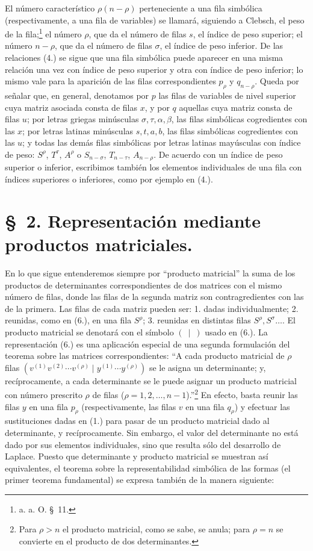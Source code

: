 \documentclass[11pt]{article}
\begin{document}
El número característico $\rho(n-\rho)$ perteneciente a una fila simbólica (respectivamente, a una fila de variables) se llamará, siguiendo a Clebsch, el peso de la fila;\footnote{a. a. O. \S\ 11.} el número $\rho$, que da el número de filas $s$, el índice de peso superior; el número $n-\rho$, que da el número de filas $\sigma$, el índice de peso inferior. De las relaciones (4.) se sigue que una fila simbólica puede aparecer en una misma relación una vez con índice de peso superior y otra con índice de peso inferior; lo mismo vale para la aparición de las filas correspondientes $p_\rho$ y $q_{n-\rho}$. Queda por señalar que, en general, denotamos por $p$ las filas de variables de nivel superior cuya matriz asociada consta de filas $x$, y por $q$ aquellas cuya matriz consta de filas $u$; por letras griegas minúsculas $\sigma,\tau,\alpha,\beta$, las filas simbólicas cogredientes con las $x$; por letras latinas minúsculas $s,t,a,b$, las filas simbólicas cogredientes con las $u$; y todas las demás filas simbólicas por letras latinas mayúsculas con índice de peso: $S^\rho$, $T^\tau$, $A^\rho$ o $S_{n-\sigma}$, $T_{n-\tau}$, $A_{n-\rho}$. De acuerdo con un índice de peso superior o inferior, escribimos también los elementos individuales de una fila con índices superiores o inferiores, como por ejemplo en (4.).
\clearpage
\section*{\S\ 2. Representación mediante productos matriciales.}
En lo que sigue entenderemos siempre por ``producto matricial'' la suma de los productos de determinantes correspondientes de dos matrices con el mismo número de filas, donde las filas de la segunda matriz son contragredientes con las de la primera. Las filas de cada matriz pueden ser: 1. dadas individualmente; 2. reunidas, como en (6.), en una fila $S^\rho$; 3. reunidas en distintas filas $S^\rho,S^\sigma\ldots$. El producto matricial se denotará con el símbolo $(\ \mid\ )$ usado en (6.). La representación (6.) es una aplicación especial de una segunda formulación del teorema sobre las matrices correspondientes: ``A cada producto matricial de $\rho$ filas $(v^{(1)}v^{(2)}\cdots v^{(\rho)}\mid y^{(1)}\cdots y^{(\rho)})$ se le asigna un determinante; y, recíprocamente, a cada determinante se le puede asignar un producto matricial con número prescrito $\rho$ de filas ($\rho=1,2,\ldots,n-1$).''\footnote{Para $\rho>n$ el producto matricial, como se sabe, se anula; para $\rho=n$ se convierte en el producto de dos determinantes.} En efecto, basta reunir las filas $y$ en una fila $p_\rho$ (respectivamente, las filas $v$ en una fila $q_\rho$) y efectuar las sustituciones dadas en (1.) para pasar de un producto matricial dado al determinante, y recíprocamente. Sin embargo, el valor del determinante no está dado por sus elementos individuales, sino que resulta sólo del desarrollo de Laplace. Puesto que determinante y producto matricial se muestran así equivalentes, el teorema sobre la representabilidad simbólica de las formas (el primer teorema fundamental) se expresa también de la manera siguiente:
\end{document}

